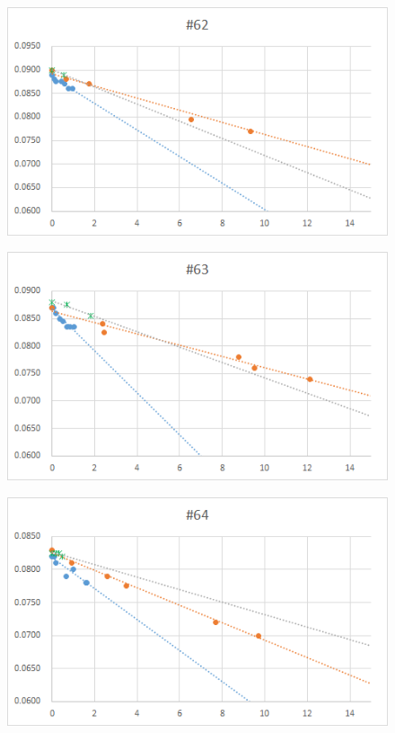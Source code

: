 \documentclass[12pt,a4paper]{jarticle}
\begin{document}
\begin{figure}[htbp]
  \centering
     \includegraphics[width=120mm]{vol_062.png}
\end{figure}
\begin{figure}[htbp]
  \centering
     \includegraphics[width=120mm]{vol_063.png}
\end{figure}
\begin{figure}[htbp]
  \centering
     \includegraphics[width=120mm]{vol_064.png}
\end{figure}
\end{document}
